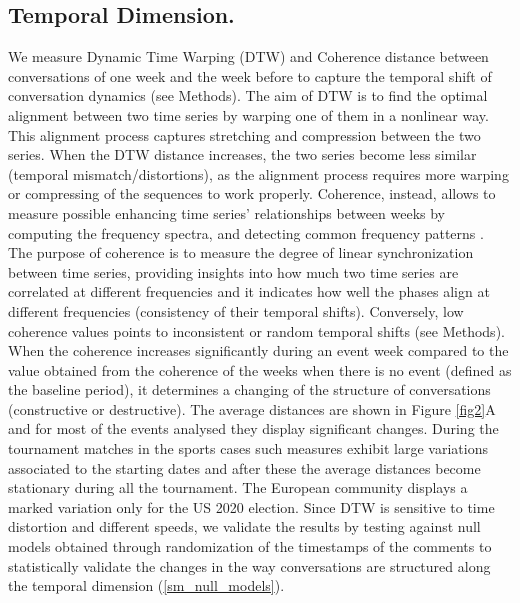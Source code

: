 \documentclass[fleqn,10pt]{wlscirep}
\begin{document}
\subsection*{Temporal Dimension.}
%
We measure Dynamic Time Warping (DTW) and Coherence distance between conversations of one week and the week before to capture the temporal shift of conversation dynamics (see Methods). 
The aim of DTW \cite{berndt1994using} is to find the optimal alignment between two time series by warping one of them in a nonlinear way. This alignment process captures stretching and compression between the two series. 
When the DTW distance increases, the two series become less similar (temporal mismatch/distortions), as the alignment process requires more warping or compressing of the sequences to work properly.
Coherence, instead, allows to measure possible enhancing time series' relationships between weeks by computing the frequency spectra, and detecting common frequency patterns \cite{grinsted2004application,maharaj2010coherence}. 
The purpose of coherence is to measure the degree of linear synchronization between time series, providing insights into how much two time series are correlated at different frequencies and it indicates how well the phases align at different frequencies (consistency of their temporal shifts).
Conversely, low coherence values points to inconsistent or random temporal shifts (see Methods).
When the coherence increases significantly during an event week compared to the value obtained from the coherence of the weeks when there is no event (defined as the baseline period), it determines a changing of the structure of conversations (constructive or destructive).
%
The average distances are shown in Figure \ref{fig2}A and for most of the events analysed they display significant changes.
During the tournament matches in the sports cases such measures exhibit large variations associated to the starting dates and after these the average distances become stationary during all the tournament. The European community displays a marked variation only for the US 2020 election.
%
Since DTW is sensitive to time distortion and different speeds, we validate the results by testing against null models obtained through randomization of the timestamps of the comments to statistically validate the changes in the way conversations are structured along the temporal dimension (\ref{sm_null_models}).
%
\end{document}
